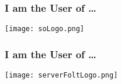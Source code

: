 \documentclass{beamer}
\begin{document}
\begin{frame}
  \frametitle{I am the User of \ldots}
  \begin{center}
    \texttt{[image: soLogo.png]}
  \end{center}
\end{frame}
\begin{frame}
  \frametitle{I am the User of \ldots}
  \begin{center}
    \texttt{[image: serverFoltLogo.png]}
  \end{center}
\end{frame}
\end{document}
